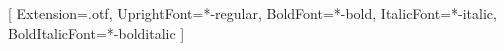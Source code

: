 \usepackage{amsmath}

\usepackage{fontspec,unicode-math}
\setmainfont{texgyrepagella}[
  Extension=.otf,
  UprightFont=*-regular,
  BoldFont=*-bold,
  ItalicFont=*-italic,
  BoldItalicFont=*-bolditalic
]


\usepackage{showkeys}

\newcommand{\MM}{\overline{\mathcal{M}}}
\newcommand{\EE}{\mathbb{E}}
\newcommand{\dd}{\mathrm{d}}

\DeclareMathOperator{\Cin}{\mathrm{Cin}}

\newtheorem{thm}{Theorem}[section]
\newtheorem{dfn}[thm]{Definition}
\newtheorem{lmm}[thm]{Lemma}
\newtheorem{rmk}[thm]{Remark}

\newenvironment{prf}{\noindent \textbf{Proof: }}{\hfill $\mdlgwhtsquare$}
\newenvironment{prfn}[1]{\vskip 1em \noindent \textbf{Proof of #1: }}{\hfill $\mdlgwhtsquare$}

\newtheorem{prp}[thm]{Proposition}
\newtheorem{crl}[thm]{Corollary}
